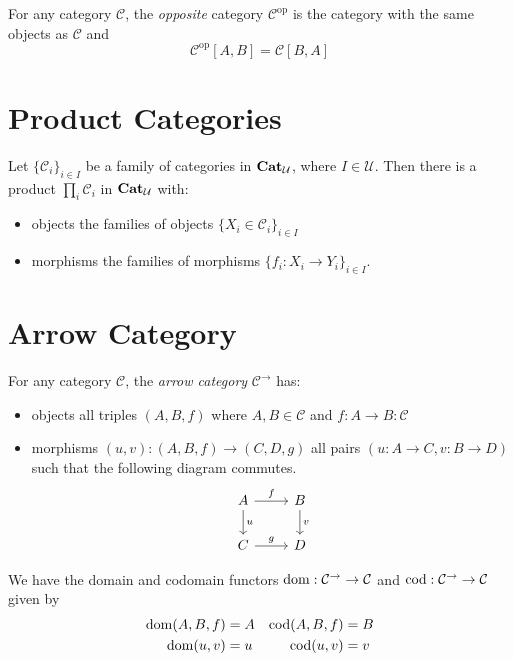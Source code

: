 \begin{df}
    For any category $\mathcal{C}$, the \emph{opposite} category $\mathcal{C}^\mathrm{op}$ is the category with the same objects as $\mathcal{C}$ and
    \[ \mathcal{C}^\mathrm{op}[A,B] = \mathcal{C}[B,A] \]
\end{df}

\section{Product Categories}

\begin{thm}
Let $\{ \mathcal{C}_i \}_{i \in I}$ be a family of categories in $\mathbf{Cat}_{\mathcal{U}}$, where $I \in \mathcal{U}$. Then there is a product $\prod_i \mathcal{C}_i$ in $\mathbf{Cat}_{\mathcal{U}}$ with:
\begin{itemize}
\item objects the families of objects $\{ X_i \in \mathcal{C}_i \}_{i \in I}$
\item morphisms the families of morphisms $\{ f_i : X_i \rightarrow Y_i \}_{i \in I}$.
\end{itemize}
\end{thm}


\section{Arrow Category}

\begin{df}
For any category $\mathcal{C}$, the \emph{arrow category} $\mathcal{C}^\rightarrow$ has:
\begin{itemize}
\item objects all triples $(A,B,f)$ where $A,B \in \mathcal{C}$ and $f : A \rightarrow B : \mathcal{C}$
\item morphisms $(u,v) : (A,B,f) \rightarrow (C,D,g)$ all pairs $(u : A \rightarrow C, v : B \rightarrow D)$ such that the following diagram commutes.
\[ \begin{tikzcd}
A \arrow[r,"f"] \arrow[d,"u"] & B \arrow[d,"v"] \\
C \arrow[r,"g"] & D
\end{tikzcd} \]
\end{itemize}

We have the domain and codomain functors $\operatorname{dom} : \mathcal{C}^\rightarrow \rightarrow \mathcal{C}$ and $\operatorname{cod} : \mathcal{C}^\rightarrow \rightarrow \mathcal{C}$ given by
\begin{align*}
\operatorname{dom} (A,B,f) & = A & \operatorname{cod} (A,B,f) & = B \\
\operatorname{dom}(u,v) & = u & \operatorname{cod} (u,v) & = v
\end{align*}
\end{df}

